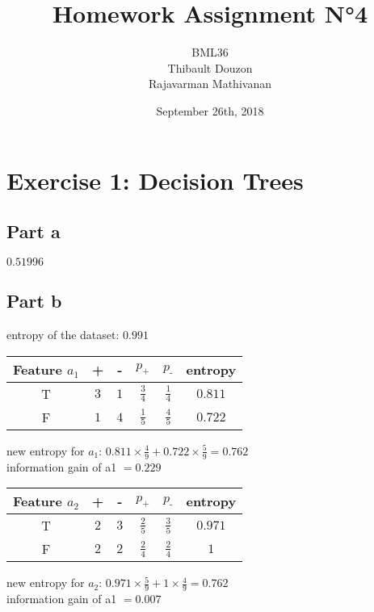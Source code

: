 \documentclass[a4paper, 10pt]{article}
\title{Homework Assignment N°4}
\author{BML36\\Thibault Douzon\\Rajavarman Mathivanan}
\date{September 26th, 2018}
\begin{document}
\maketitle

\pagebreak

\tableofcontents

\pagebreak
\section{Exercise 1: Decision Trees}
\subsection{Part a}
$0.51996$
\subsection{Part b}
entropy of the dataset: $0.991$
\begin{center}
    \begin{tabular}{ |c|c|c|c|c|c| }
        \hline
        Feature $a_1$ & +      & -     & $p_\text{+}$ & $p_\text{-}$ & entropy\\
        \hline
        T          & $3$    & $1$   & $\frac{3}{4}$ & $\frac{1}{4}$ & $0.811$\\
        \hline
        F          & $1$    & $4$   & $\frac{1}{5}$ & $\frac{4}{5}$ & $0.722$\\
        \hline
    \end{tabular}
\end{center}
new entropy for $a_1$: $0.811\times\frac{4}{9} + 0.722\times\frac{5}{9} = 0.762$
\\
information gain of a1 $= 0.229$

\begin{center}
    \begin{tabular}{ |c|c|c|c|c|c| }
        \hline
        Feature $a_2$ & +      & -     & $p_\text{+}$ & $p_\text{-}$ & entropy\\
        \hline
        T          & $2$    & $3$   & $\frac{2}{5}$ & $\frac{3}{5}$ & $0.971$\\
        \hline
        F          & $2$    & $2$   & $\frac{2}{4}$ & $\frac{2}{4}$ & $1$\\
        \hline
    \end{tabular}
\end{center}
new entropy for $a_2$: $0.971\times\frac{5}{9} + 1\times\frac{4}{9} = 0.762$
\\
information gain of a1 $= 0.007$
\end{document}
